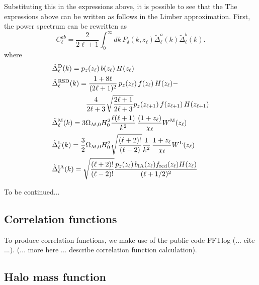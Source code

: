 \documentclass[\docopts]{\docclass}
\begin{document}
Substituting this in the expressions above, it is possible to see that the The expressions above can be written as follows in the Limber approximation. First, the power spectrum
can be rewritten as
\begin{equation}
 C^{ab}_\ell=\frac{2}{2\ell+1}\int_0^\infty dk\,P_\delta\left(k,z_\ell\right)
 \tilde{\Delta}^a_\ell(k)\tilde{\Delta}^b_\ell(k).
\end{equation}
where
\begin{align}
 &\tilde{\Delta}_\ell^{\rm D}(k)=p_z(z_\ell)\,b(z_\ell)\,H(z_\ell)\\
 &\tilde{\Delta}_\ell^{\rm RSD}(k)=
 \frac{1+8\ell}{(2\ell+1)^2}\,p_z(z_\ell)\,f(z_\ell)\,H(z_\ell)-\\
 &\hspace{48pt}\frac{4}{2\ell+3}\sqrt{\frac{2\ell+1}{2\ell+3}}p_z(z_{\ell+1})\,f(z_{\ell+1})\,H(z_{\ell+1})\\
 &\tilde{\Delta}_\ell^{\rm M}(k)=3\Omega_{M,0}H_0^2\frac{\ell(\ell+1)}{k^2}\,
 \frac{(1+z_\ell)}{\chi_\ell}W^{\rm M}(z_\ell)\\
 &\tilde{\Delta}_\ell^{\rm L}(k)=\frac{3}{2}\Omega_{M,0}H_0^2\sqrt{\frac{(\ell+2)!}{(\ell-2)}}\frac{1}{k^2}\,
 \frac{1+z_\ell}{\chi_\ell}W^{\rm L}(z_\ell)\\
 &\tilde{\Delta}_\ell^{\rm IA}(k)=\sqrt{\frac{(\ell+2)!}{(\ell-2)!}}\frac{p_z(z_\ell)\,b_{\rm IA}(z_\ell)f_{\rm red}(z_\ell)H(z_\ell)}{(\ell+1/2)^2}
\end{align}

To be continued...



\subsection{Correlation functions}
\label{sec:corr}

To produce correlation functions, we make use of the public code FFTlog (... cite ...). (... more here ... describe correlation function calculation).



\subsection{Halo mass function}
\label{sec:hmf}
\end{document}
